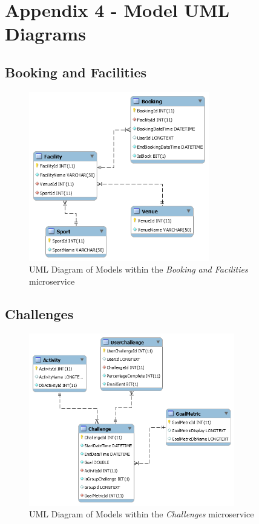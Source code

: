 \section{Appendix 4 - Model UML Diagrams}


\subsection{Booking and Facilities}
\begin{figure}[H]
    \centering
    \includegraphics[width=0.7\textwidth]{Images/db_uml/booking-facilities.png}
    \caption{UML Diagram of Models within the \textit{Booking and Facilities} microservice}
    \label{fig:db_uml:booking-facilities}
\end{figure}

\subsection{Challenges}
\begin{figure}[H]
    \centering
    \includegraphics[width=0.8\textwidth]{Images/db_uml/challenges.png}
    \caption{UML Diagram of Models within the \textit{Challenges} microservice}
    \label{fig:db_uml:challenges}
\end{figure}

